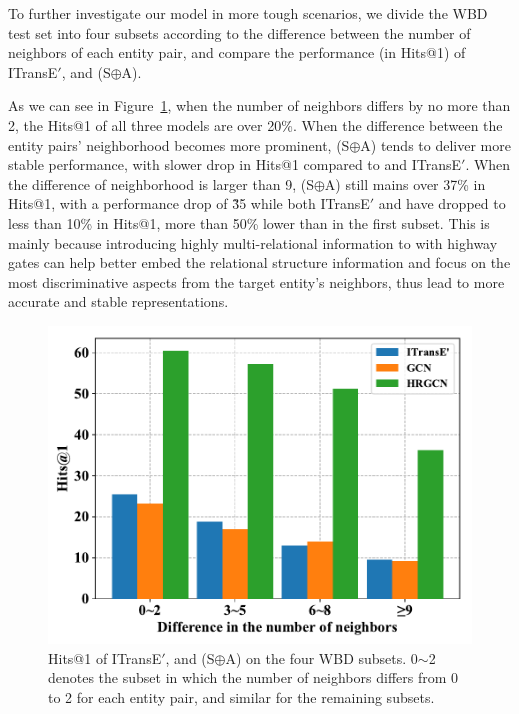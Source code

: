 To further investigate our model in more tough scenarios, %
we divide the WBD test set into four subsets according to the difference between the number of neighbors of each entity pair, and compare the performance (in Hits@1) of ITransE$'$, \GCN and \HRGCN (S$\oplus$A). %

As we can see in Figure~\ref{subset}, when the number of neighbors differs by no more than 2, the Hits@1 of all three models are over 20\%.
When the difference between the entity pairs' neighborhood becomes more prominent,
\HRGCN (S$\oplus$A) tends to deliver more stable performance, with slower drop in  Hits@1 compared to \GCN and ITransE$'$.
When the difference of neighborhood is larger than 9,  \HRGCN (S$\oplus$A) still mains over 37\% in Hits@1, with a performance drop of \~35%
while both ITransE$'$ and \GCN have dropped to less than 10\% in  Hits@1, more than 50\% lower than in the first subset.
This is mainly because introducing highly multi-relational information to \GCN with highway gates can help better embed the relational structure information and focus on the most discriminative aspects from the target entity's neighbors, thus lead to more accurate and stable representations.
\begin{figure}
	\centering
	\includegraphics[width=0.8\linewidth]{figures/graph4.pdf}
	\caption{Hits@1 of ITransE$'$, \GCN and \HRGCN (S$\oplus$A) on the four WBD subsets. 0$\sim$2 denotes the subset in which the number of neighbors differs from 0 to 2 for each entity pair, and similar for the remaining subsets.}
	\label{subset}
\end{figure}

